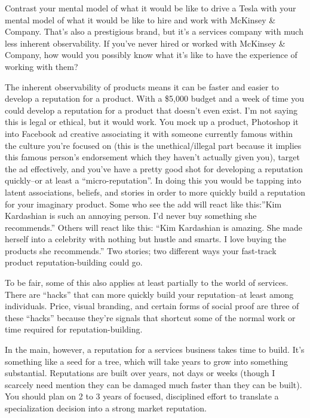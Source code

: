 Contrast your mental model of what it would be like to drive a Tesla with your mental model of what it would be like to hire and work with McKinsey \& Company. That's also a prestigious brand, but it's a services company with much less inherent observability. If you've never hired or worked with McKinsey \& Company, how would you possibly know what it's like to have the experience of working with them?

The inherent observability of products means it can be faster and easier to develop a reputation for a product. With a \$5,000 budget and a week of time you could develop a reputation for a product that doesn't even exist. I'm not saying this is legal or ethical, but it would work. You mock up a product, Photoshop it into Facebook ad creative associating it with someone currently famous within the culture you're focused on (this is the unethical/illegal part because it implies this famous person's endorsement which they haven't actually given you), target the ad effectively, and you've have a pretty good shot for developing a reputation quickly--or at least a ``micro-reputation''. In doing this you would be tapping into latent associations, beliefs, and stories in order to more quickly build a reputation for your imaginary product. Some who see the add will react like this:''Kim Kardashian is such an annoying person. I'd never buy something she recommends.'' Others will react like this: ``Kim Kardashian is amazing. She made herself into a celebrity with nothing but hustle and smarts. I love buying the products she recommends.'' Two stories; two different ways your fast-track product reputation-building could go.

To be fair, some of this also applies at least partially to the world of services. There are ``hacks'' that can more quickly build your reputation--at least among individuals. Price, visual branding, and certain forms of social proof are three of these ``hacks'' because they're signals that shortcut some of the normal work or time required for reputation-building.

In the main, however, a reputation for a services business takes time to build. It's something like a seed for a tree, which will take years to grow into something substantial. Reputations are built over years, not days or weeks (though I scarcely need mention they can be damaged much faster than they can be built). You should plan on 2 to 3 years of focused, disciplined effort to translate a specialization decision into a strong market reputation.


